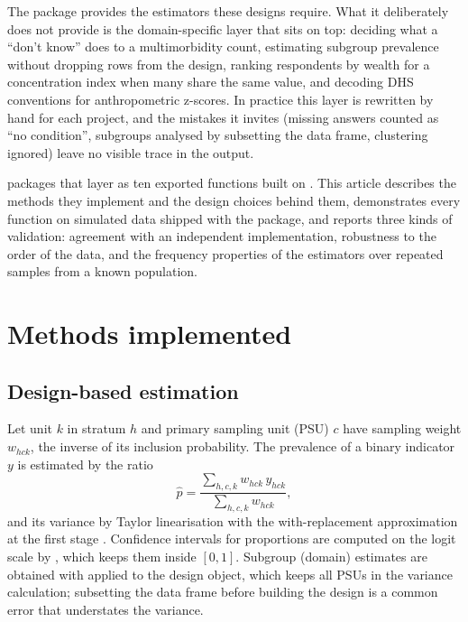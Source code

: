 The  package \citep{lumley2004, lumley2010} provides the estimators these designs require. What it deliberately does not provide is the domain-specific layer that sits on top: deciding what a ``don't know'' does to a multimorbidity count, estimating subgroup prevalence without dropping rows from the design, ranking respondents by wealth for a concentration index when many share the same value, and decoding DHS conventions for anthropometric z-scores. In practice this layer is rewritten by hand for each project, and the mistakes it invites (missing answers counted as ``no condition'', subgroups analysed by subsetting the data frame, clustering ignored) leave no visible trace in the output.

 packages that layer as ten exported functions built on . This article describes the methods they implement and the design choices behind them, demonstrates every function on simulated data shipped with the package, and reports three kinds of validation: agreement with an independent implementation, robustness to the order of the data, and the frequency properties of the estimators over repeated samples from a known population.

\section{Methods implemented}

\subsection{Design-based estimation}

Let unit $k$ in stratum $h$ and primary sampling unit (PSU) $c$ have sampling weight $w_{hck}$, the inverse of its inclusion probability. The prevalence of a binary indicator $y$ is estimated by the ratio
\begin{equation}
\hat p = \frac{\sum_{h,c,k} w_{hck}\, y_{hck}}{\sum_{h,c,k} w_{hck}},
\label{eq:ratio}
\end{equation}
and its variance by Taylor linearisation with the with-replacement approximation at the first stage \citep{binder1983, lumley2010}. Confidence intervals for proportions are computed on the logit scale by , which keeps them inside $[0, 1]$. Subgroup (domain) estimates are obtained with  applied to the design object, which keeps all PSUs in the variance calculation; subsetting the data frame before building the design is a common error that understates the variance.

